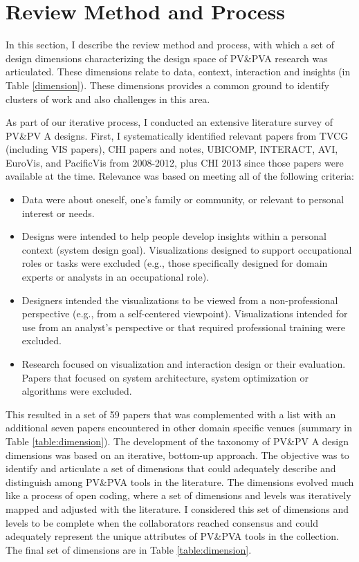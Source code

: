 \documentclass[12pt,oneside]{book}
\begin{document}
\section{Review Method and Process}
In this section, I describe the review method and process, with which a set of design dimensions characterizing the design space of PV\&PVA research was articulated. These dimensions relate to data, context, interaction and insights (in Table \ref{dimension}).  These dimensions provides a common ground to identify clusters of work and also challenges in this area.

As part of our iterative process, I conducted an extensive literature survey of PV\&PV A designs.  First, I systematically identified relevant papers from TVCG (including VIS papers), CHI papers and notes, UBICOMP, INTERACT, AVI, EuroVis, and PacificVis from 2008-2012, plus CHI 2013 since those papers were available at the time.  Relevance was based on meeting all of the following criteria:

\begin{itemize}
	\item{Data were about oneself, one's family or community, or relevant to personal interest or needs.}
	\item{Designs were intended to help people develop insights within a personal context (system design goal). Visualizations designed to support occupational roles or tasks were excluded (e.g., those specifically designed for domain experts or analysts in an occupational role).}
	\item{Designers intended the visualizations to be viewed from a non-professional perspective (e.g., from a self-centered viewpoint). Visualizations intended for use from an analyst's perspective or that required professional training were excluded.}
	\item{Research focused on visualization and interaction design or their evaluation. Papers that focused on system architecture, system optimization or algorithms were excluded.}
\end{itemize}

This resulted in a set of 59 papers that was complemented with a list with an additional seven papers encountered in other domain specific venues (summary in Table \ref{table:dimension}).
The development of the taxonomy of PV\&PV A design dimensions was based on an iterative, bottom-up approach.  The objective was to identify and articulate a set of dimensions that could adequately describe and distinguish among PV\&PVA tools in the literature.  The dimensions evolved much like a process of open coding, where a set of dimensions and levels was iteratively mapped and adjusted with the literature.  I considered this set of dimensions and levels to be complete when the collaborators reached consensus and could adequately represent the unique attributes of PV\&PVA tools in the collection. The final set of dimensions are in Table \ref{table:dimension}.
\end{document}
